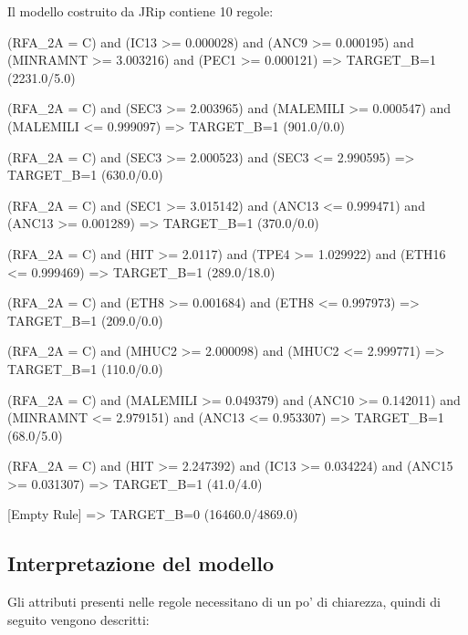 \noindent
Il modello costruito da JRip contiene 10 regole:
\begin{verbatimtab}
(RFA_2A = C)		and
(IC13 >= 0.000028)	and
(ANC9 >= 0.000195)	and
(MINRAMNT >= 3.003216)	and
(PEC1 >= 0.000121)	=> TARGET_B=1 (2231.0/5.0)

(RFA_2A = C)		and
(SEC3 >= 2.003965)	and
(MALEMILI >= 0.000547)	and
(MALEMILI <= 0.999097)	=> TARGET_B=1 (901.0/0.0)

(RFA_2A = C)		and
(SEC3 >= 2.000523)	and
(SEC3 <= 2.990595)	=> TARGET_B=1 (630.0/0.0)

(RFA_2A = C)		and
(SEC1 >= 3.015142)	and
(ANC13 <= 0.999471)	and
(ANC13 >= 0.001289)	=> TARGET_B=1 (370.0/0.0)

(RFA_2A = C)		and
(HIT >= 2.0117)		and
(TPE4 >= 1.029922)	and
(ETH16 <= 0.999469)	=> TARGET_B=1 (289.0/18.0)

(RFA_2A = C)		and
(ETH8 >= 0.001684)	and
(ETH8 <= 0.997973)	=> TARGET_B=1 (209.0/0.0)

(RFA_2A = C)		and
(MHUC2 >= 2.000098)	and
(MHUC2 <= 2.999771)	=> TARGET_B=1 (110.0/0.0)

(RFA_2A = C)		and
(MALEMILI >= 0.049379)	and
(ANC10 >= 0.142011)	and
(MINRAMNT <= 2.979151)	and
(ANC13 <= 0.953307)	=> TARGET_B=1 (68.0/5.0)

(RFA_2A = C)		and
(HIT >= 2.247392)	and
(IC13 >= 0.034224)	and
(ANC15 >= 0.031307)	=> TARGET_B=1 (41.0/4.0)

[Empty Rule]		=> TARGET_B=0 (16460.0/4869.0)
\end{verbatimtab}

\subsection{Interpretazione del modello}
Gli attributi presenti nelle regole necessitano di un po' di chiarezza, quindi di seguito vengono descritti:

